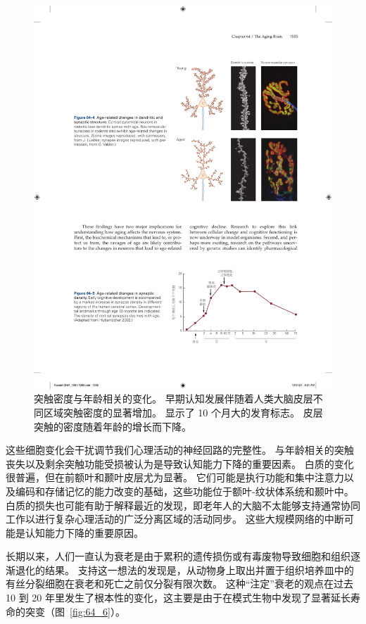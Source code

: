 \begin{figure}[htbp]
	\centering
	\includegraphics[width=0.82\linewidth]{chap64/fig_64_5}
	\caption{突触密度与年龄相关的变化。
		早期认知发展伴随着人类大脑皮层不同区域突触密度的显著增加。
		显示了 10 个月大的发育标志。
		皮层突触的密度随着年龄的增长而下降\cite{huttenlocher2009neural}。}
	\label{fig:64_5}
\end{figure}


这些细胞变化会干扰调节我们心理活动的神经回路的完整性。
与年龄相关的突触丧失以及剩余突触功能受损被认为是导致认知能力下降的重要因素。
白质的变化很普遍，但在前额叶和颞叶皮层尤为显著。
它们可能是执行功能和集中注意力以及编码和存储记忆的能力改变的基础，这些功能位于额叶-纹状体系统和颞叶中。
白质的损失也可能有助于解释最近的发现，即老年人的大脑不太能够支持通常协同工作以进行复杂心理活动的广泛分离区域的活动同步。
这些大规模网络的中断可能是认知能力下降的重要原因。


长期以来，人们一直认为衰老是由于累积的遗传损伤或有毒废物导致细胞和组织逐渐退化的结果。
支持这一想法的发现是，从动物身上取出并置于组织培养皿中的有丝分裂细胞在衰老和死亡之前仅分裂有限次数。
这种“注定”衰老的观点在过去 10 到 20 年里发生了根本性的变化，这主要是由于在模式生物中发现了显著延长寿命的突变（图~\ref{fig:64_6}）。



